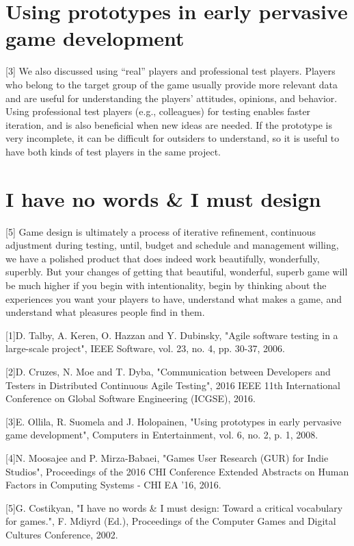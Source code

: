 \documentclass{beamer}
\begin{document}
	\begin{frame}
	\section{Using prototypes in early pervasive game development}
	
	[3] We also discussed using “real” players and professional test players. Players who belong to the target group of the game usually provide more relevant data and are useful for understanding the players’ attitudes, opinions, and behavior. Using professional test players (e.g., colleagues) for testing enables faster iteration, and is also beneficial when new ideas are needed. If the prototype is very incomplete, it can be difficult for outsiders to understand, so it is useful to have both kinds of test players in the same project.
	
	\section{I have no words & I must design}
	
	[5] Game design is ultimately a process of iterative refinement, continuous adjustment during testing, until, budget and schedule and management willing, we have a polished product that does indeed work beautifully, wonderfully, superbly. But your changes of getting that beautiful, wonderful, superb game will be much higher if you begin with intentionality, begin by thinking about the experiences you want your players to have, understand what makes a game, and understand what pleasures people find in them.
	\end{frame}
	\begin{frame}
	\small	[1]D. Talby, A. Keren, O. Hazzan and Y. Dubinsky, "Agile software testing in a large-scale project", IEEE Software, vol. 23, no. 4, pp. 30-37, 2006.
		
		[2]D. Cruzes, N. Moe and T. Dyba, "Communication between Developers and Testers in Distributed Continuous Agile Testing", 2016 IEEE 11th International Conference on Global Software Engineering (ICGSE), 2016. 
		
		[3]E. Ollila, R. Suomela and J. Holopainen, "Using prototypes in early pervasive game development", Computers in Entertainment, vol. 6, no. 2, p. 1, 2008.
		
		[4]N. Moosajee and P. Mirza-Babaei, "Games User Research (GUR) for Indie Studios", Proceedings of the 2016 CHI Conference Extended Abstracts on Human Factors in Computing Systems - CHI EA '16, 2016.
		
		[5]G. Costikyan, "I have no words & I must design: Toward a critical vocabulary for games.", F. Mdiyrd (Ed.), Proceedings of the Computer Games and Digital Cultures Conference, 2002.
	\end{frame}
\end{document}
